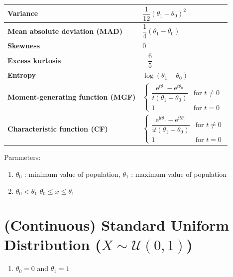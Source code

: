 \begin{longtable}{|m{6cm}|p{9cm}|}
    \textbf{Variance} &
    ${\displaystyle {\dfrac {1}{12}}(\theta_1-\theta_0)^{2}}$
    \\[1ex] \hline

    \textbf{Mean absolute deviation (MAD)} &
    ${\displaystyle {\dfrac {1}{4}}(\theta_1-\theta_0)}$
    \\[1ex] \hline

    \textbf{Skewness} &
    $0$
    \\ \hline

    \textbf{Excess kurtosis} &
    ${\displaystyle -{\dfrac {6}{5}}}$
    \\[1ex] \hline

    \textbf{Entropy} &
    ${\displaystyle \log(\theta_1-\theta_0)}$
    \\[1ex] \hline

    \textbf{Moment-generating function (MGF)} &
    ${\displaystyle {\begin{cases}{\dfrac {\mathrm {e} ^{t\theta_1}-\mathrm {e} ^{t\theta_0}}{t(\theta_1-\theta_0)}}&{\text{for }}t\neq 0\\1&{\text{for }}t=0\end{cases}}}$
    \\[1ex] \hline

    \textbf{Characteristic function (CF)} &
    ${\displaystyle {\begin{cases}{\dfrac {\mathrm {e} ^{\mathrm {i} t\theta_1}-\mathrm {e} ^{\mathrm {i} t\theta_0}}{\mathrm {i} t(\theta_1-\theta_0)}}&{\text{for }}t\neq 0\\1&{\text{for }}t=0\end{cases}}}$
    \\[1ex] \hline

\end{longtable}
\renewcommand{\arraystretch}{1}

Parameters:
\begin{enumerate}
    \item $\theta_0$ : minimum value of population, $\theta_1$ : maximum value of population

    \item 
        \hfill
        $\theta_0 < \theta_1$
        \hfill
        $\theta_0 \leq x \leq \theta_1$
        \hfill

\end{enumerate}



\section{(Continuous) Standard Uniform Distribution ($X \sim \mathcal{U}(0,1)$) \cite{ism-1}} \label{Standard Uniform Distribution}

\begin{enumerate}
    \item $\theta_0 = 0$ and $\theta_1 = 1$

\end{enumerate}

























